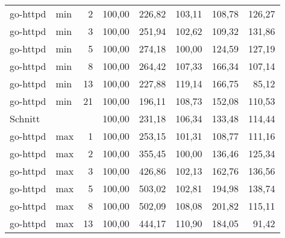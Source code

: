 \begin{footnotesize}
\begin{longtable}{llrrrrrr}
		go-httpd       & min     & 2          & 100,00 & 226,82                      & 103,11                      & 108,78                      & 126,27                      \\
		go-httpd       & min     & 3          & 100,00 & 251,94                      & 102,62                      & 109,32                      & 131,86                      \\
		go-httpd       & min     & 5          & 100,00 & 274,18                      & \cellcolor[HTML]{C0C0C0}100,00 & 124,59                      & 127,19                      \\
		go-httpd       & min     & 8          & 100,00 & 264,42                      & 107,33                      & 166,34                      & 107,14                      \\
		go-httpd       & min     & 13         & 100,00 & 227,88                      & 119,14                      & 166,75                      & 85,12                       \\
		go-httpd       & min     & 21         & 100,00 & 196,11                      & 108,73                      & 152,08                      & 110,53                      \\ \hline
		Schnitt        &         &            & 100,00 & 231,18                      & 106,34                      & 133,48                      & 114,44                      \\ \hline
		go-httpd       & max     & 1          & 100,00 & 253,15                      & 101,31                      & 108,77                      & 111,16                      \\
		go-httpd       & max     & 2          & 100,00 & 355,45                      & \cellcolor[HTML]{C0C0C0}100,00 & 136,46                      & 125,34                      \\
		go-httpd       & max     & 3          & 100,00 & 426,86                      & 102,13                      & 162,76                      & 136,56                      \\
		go-httpd       & max     & 5          & 100,00 & 503,02                      & 102,81                      & 194,98                      & 138,74                      \\
		go-httpd       & max     & 8          & 100,00 & 502,09                      & 108,08                      & 201,82                      & 115,11                      \\
		go-httpd       & max     & 13         & 100,00 & 444,17                      & 110,90                      & 184,05                      & 91,42                       \\

\end{longtable}
\end{footnotesize}
